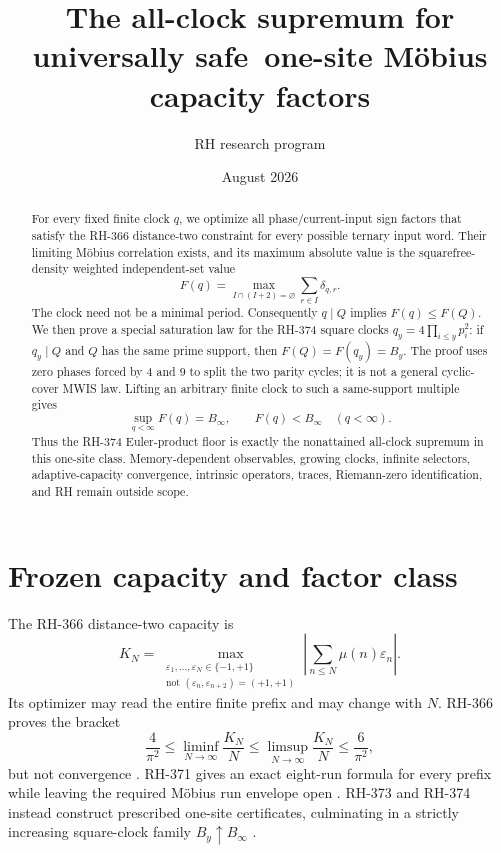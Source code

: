 \documentclass[11pt]{article}
\title{The all-clock supremum for universally safe\
one-site M\"obius capacity factors}
\author{RH research program}
\date{August 2026}
\theoremstyle{definition}
\theoremstyle{remark}
\newcommand{\Mob}{\mu}
\newcommand{\dd}{\delta}
\newcommand{\eps}{\varepsilon}
\begin{document}
\maketitle

\begin{abstract}
For every fixed finite clock $q$, we optimize all phase/current-input sign
factors that satisfy the RH-366 distance-two constraint for every possible
ternary input word.  Their limiting M\"obius correlation exists, and its
maximum absolute value is the squarefree-density weighted independent-set
value
\[
 F(q)=\max_{I\cap(I+2)=\varnothing}\sum_{r\in I}\dd_{q,r}.
\]
The clock need not be a minimal period.  Consequently $q\mid Q$ implies
$F(q)\le F(Q)$.  We then prove a special saturation law for the RH-374 square
clocks $q_y=4\prod_{i\le y}p_i^2$: if $q_y\mid Q$ and $Q$ has the same prime
support, then $F(Q)=F(q_y)=B_y$.  The proof uses zero phases forced by $4$
and $9$ to split the two parity cycles; it is not a general cyclic-cover MWIS
law.  Lifting an arbitrary finite clock to such a same-support multiple gives
\[
             \sup_{q<\infty}F(q)=B_\infty,
             \qquad F(q)<B_\infty\quad(q<\infty).
\]
Thus the RH-374 Euler-product floor is exactly the nonattained all-clock
supremum in this one-site class.  Memory-dependent observables, growing
clocks, infinite selectors, adaptive-capacity convergence, intrinsic
operators, traces, Riemann-zero identification, and RH remain outside scope.
\end{abstract}

\section{Frozen capacity and factor class}

The RH-366 distance-two capacity is
\begin{equation}
 K_N=\max_{\substack{\eps_1,\ldots,\eps_N\in\{-1,+1\}\\
 \text{not }(\eps_n,\eps_{n+2})=(+1,+1)}}
 \left|\sum_{n\le N}\Mob(n)\eps_n\right|.
 \label{eq:capacity}
\end{equation}
Its optimizer may read the entire finite prefix and may change with $N$.
RH-366 proves the bracket
\begin{equation}
 \frac4{\pi^2}\le\liminf_{N\to\infty}\frac{K_N}{N}
 \le\limsup_{N\to\infty}\frac{K_N}{N}\le\frac6{\pi^2},
 \label{eq:capacity-bracket}
\end{equation}
but not convergence \cite{RH366}.  RH-371 gives an exact eight-run formula
for every prefix while leaving the required M\"obius run envelope open
\cite{RH371}.  RH-373 and RH-374 instead construct prescribed one-site
certificates, culminating in a strictly increasing square-clock family
$B_y\uparrow B_\infty$ \cite{RH373,RH374}.
\end{document}
